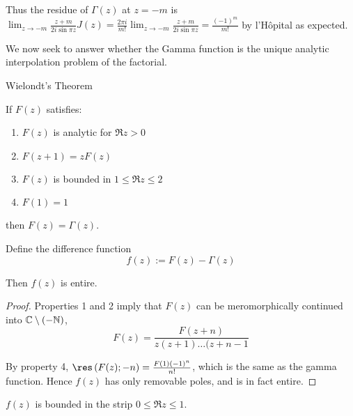 \documentclass[a4paper]{article}
\begin{document}
Thus the residue of $\Gamma(z)$ at $z = -m$ is $\lim_{z\to -m} \frac{z+m}{2i \sin \pi z} J(z) = \frac{2\pi i}{m!} \lim_{z\to -m} \frac{z+m}{2i \sin \pi z} = \frac{(-1)^{m}}{m!}$ by l'H\^{o}pital as expected. 

\vspace{1em}

We now seek to answer whether the Gamma function is the unique analytic interpolation problem of the factorial.

\begin{thm}
	Wielondt's Theorem

	If $F(z)$ satisfies:
	\begin{enumerate}
		\item $F(z)$ is analytic for $\Re z > 0$ \\
		\item  $F(z+1) = zF(z)$ \\
		\item  $F(z)$ is bounded in $1 \le  \Re z \le 2$ \\
		\item $F(1) = 1$ 
	\end{enumerate}
	then $F(z) = \Gamma(z)$.
\end{thm}

\begin{lemma}
	Define the difference function
	\[
		f(z) := F(z) - \Gamma(z)
	\]

	Then $f(z)$ is entire.
\end{lemma}

\begin{proof}
	Properties 1 and 2 imply that $F(z)$ can be meromorphically continued into $\mathbb{C} \setminus\left( -\mathbb{N} \right) $, 
	\[
		F(z) = \frac{F(z+n)}{z(z+1)\ldots(z+n-1}
	\]

	By property 4, $\res\left( F(z); -n \right) = \frac{F(1) (-1)^{n}}{n!}$, which is the same as the gamma function. Hence $f(z)$ has only removable poles, and is in fact entire.
\end{proof}

\begin{lemma}
	$f(z)$ is bounded in the strip $0 \le \Re z \le  1$.
\end{lemma}
\end{document}
